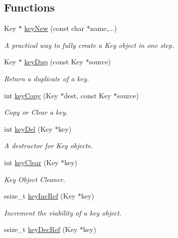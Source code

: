 \subsection*{Functions}
\begin{DoxyCompactItemize}
\item 
Key $\ast$ \mbox{\hyperlink{group__key_gad23c65b44bf48d773759e1f9a4d43b89}{key\+New}} (const char $\ast$name,...)
\begin{DoxyCompactList}\small\item\em A practical way to fully create a Key object in one step. \end{DoxyCompactList}\item 
Key $\ast$ \mbox{\hyperlink{group__key_gae6ec6a60cc4b8c1463fa08623d056ce3}{key\+Dup}} (const Key $\ast$source)
\begin{DoxyCompactList}\small\item\em Return a duplicate of a key. \end{DoxyCompactList}\item 
int \mbox{\hyperlink{group__key_ga6a12cbbe656a1ad9f41b8c681d7a2f92}{key\+Copy}} (Key $\ast$dest, const Key $\ast$source)
\begin{DoxyCompactList}\small\item\em Copy or Clear a key. \end{DoxyCompactList}\item 
int \mbox{\hyperlink{group__key_ga3df95bbc2494e3e6703ece5639be5bb1}{key\+Del}} (Key $\ast$key)
\begin{DoxyCompactList}\small\item\em A destructor for Key objects. \end{DoxyCompactList}\item 
int \mbox{\hyperlink{group__key_gab2242311a36bbc0520e0d36895107ec1}{key\+Clear}} (Key $\ast$key)
\begin{DoxyCompactList}\small\item\em Key Object Cleaner. \end{DoxyCompactList}\item 
ssize\+\_\+t \mbox{\hyperlink{group__key_ga6970a6f254d67af7e39f8e469bb162f1}{key\+Inc\+Ref}} (Key $\ast$key)
\begin{DoxyCompactList}\small\item\em Increment the viability of a key object. \end{DoxyCompactList}\item 
ssize\+\_\+t \mbox{\hyperlink{group__key_ga2c6433ca22109e4e141946057eccb283}{key\+Dec\+Ref}} (Key $\ast$key)

\end{DoxyCompactItemize}
